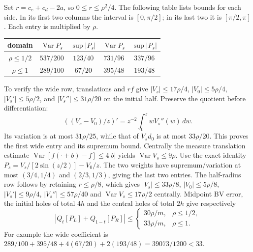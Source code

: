 Set $r=c_e+c_d-2a$, so $0\leq r\leq\rho^2/4$.
The following table lists bounds for each side. In its first two
columns the interval is $[0,\pi/2]$; in its last two it is
$[\pi/2,\pi]$. Each entry is multiplied by $\rho$.
\begin{center}
\begin{tabular}{c|cccc}
 domain&$\operatorname{Var}P_s$&$\sup|P_s|$
       &$\operatorname{Var}P_s$&$\sup|P_s|$\\ \hline
 $\rho\leq1/2$&$537/200$&$123/40$&$731/96$&$337/96$\\
 $\rho\leq1$&$289/100$&$67/20$&$395/48$&$193/48$
\end{tabular}
\end{center}
To verify the wide row, translations and $r f$ give
$|V_s|\leq17\rho/4$, $|V_0|\leq5\rho/4$,
$|V_s'|\leq5\rho/2$, and $|V_s''|\leq31\rho/20$ on the initial
half. Preserve the quotient before differentiation:
\[
 \left((V_s-V_0)/z\right)'
             =z^{-2}\int_0^z wV_s''(w)\,dw.
\]
Its variation is at most $31\rho/25$, while that of $V_sd_0$ is
at most $33\rho/20$. This proves the first wide entry and its
supremum bound. Centrally the measure translation estimate
$\operatorname{Var}[f(\cdot+b)-f]\leq4|b|$ yields
$\operatorname{Var}V_s\leq9\rho$. Use the exact identity
$P_s=V_s/[2\sin(z/2)]-V_0/z$. The two weights have
supremum/variation at most $(3/4,1/4)$ and $(2/3,1/3)$,
giving the last two entries. The half-radius row follows by retaining
$r\leq\rho/8$, which gives
$|V_s|\leq33\rho/8$, $|V_0|\leq5\rho/8$,
$|V_s'|\leq9\rho/4$, $|V_s''|\leq57\rho/40$ and
$\operatorname{Var}V_s\leq17\rho/2$ centrally.
Midpoint BV error, the initial holes of total $4h$ and the central
holes of total $2h$ give respectively
\[
 |Q_t[P_L]+Q_{1-t}[P_R]|
 \leq\begin{cases}30\rho/m,&\rho\leq1/2,\\33\rho/m,&\rho\leq1.
 \end{cases}
\]
For example the wide coefficient is
$289/100+395/48+4(67/20)+2(193/48)=39073/1200<33$.

